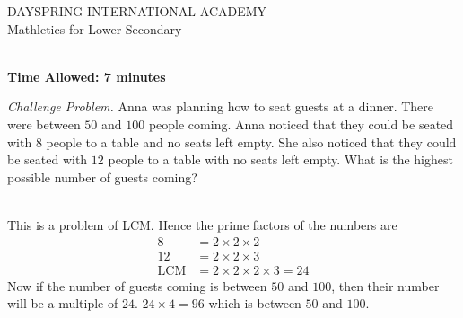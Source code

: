 \documentclass[addpoints,12pt]{exam}
\begin{document}
\begin{center}\centering
    {\large DAYSPRING INTERNATIONAL ACADEMY}\\
    Mathletics for Lower Secondary\\
\end{center}

\begin{center}
\end{center}
\vspace{0.3in}
\vspace*{0.2in}
\\
\textbf{Time Allowed: 7 minutes}

\begin{questions}
  
 \question \emph{Challenge Problem.} Anna was planning how to seat guests at a dinner. There 
were between $50$ and $100$ people coming. Anna noticed that they could be seated with $8$ people 
to a table and no seats left empty. She also noticed that they could be seated with $12$ people to 
a table with no seats left empty. What is the highest possible number of guests coming?
	\ifprintanswers
	  \begin{solution}\\
		This is a problem of LCM. Hence the prime factors of the numbers are
		\begin{align*}
		  8 &= 2\times2\times2 \\
		  12 &= 2\times2\times3 \\
		  \text{LCM} &= 2\times2\times2\times3 = 24
		\end{align*}
	Now if the number of guests coming is between $50$ and $100$, then their number will be a 
multiple of $24$. $24\times4=96$ which is between $50$ and $100$.
	  \end{solution}
	\else
	  \makeemptybox{5.3in}
	\fi
	
  
\end{questions}
\end{document}
